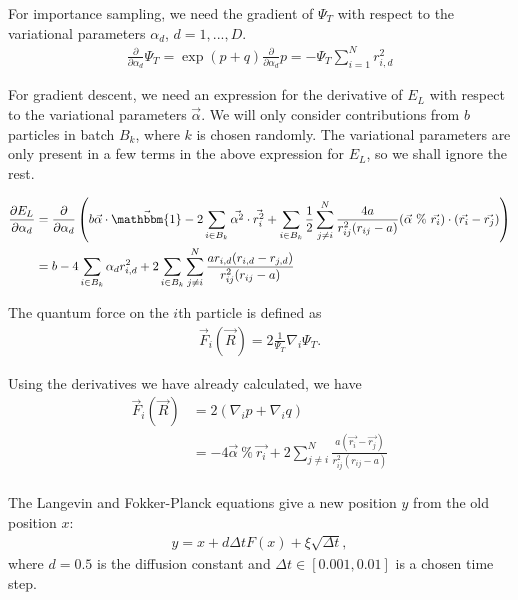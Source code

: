 \documentclass[12pt]{article}
\begin{document}
\noindent For importance sampling, we need the gradient of $\Psi_T$ with respect to the variational parameters $\alpha_d$, $d=1,...,D$. 
\begin{align*}
\frac{\partial}{\partial \alpha_d} \Psi_T = \exp(p+q) \frac{\partial}{\partial \alpha_d} p = - \Psi_T \sum_{i=1}^N r_{i,d}^2
\end{align*}

\noindent For gradient descent, we need an expression for the derivative of $E_L$ with respect to the variational parameters $\vec{\alpha}$. We will only consider contributions from $b$ particles in batch $B_k$, where $k$ is chosen randomly. The variational parameters are only present in a few terms in the above expression for $E_L$, so we shall ignore the rest. 

\begin{align*}
\frac{\partial E_L}{\partial \alpha_d} 
&= \frac{\partial}{\partial \alpha_d} \left( 
b\vec{\alpha}\cdot \vec{\mathbbm{1}} - 2 \sum_{i \in B_k} \vec{\alpha^2}\cdot \vec{r_i^2} 
+ \sum_{i\in B_k} \frac{1}{2} \sum_{j\neq i}^N \frac{4a}{r_{ij}^2(r_{ij}-a)} (\vec{\alpha} \  \% \ \vec{r_i}) \cdot (\vec{r_i}-\vec{r_j})
 \right)\\
 &= b -4 \sum_{i \in B_k} \alpha_d r_{i,d}^2 +2 \sum_{i \in B_k} \sum_{j \neq i}^N \frac{a r_{i,d}(r_{i,d}-r_{j,d})}{r_{ij}^2(r_{ij}-a)}
\end{align*}



The quantum force on the $i$th particle is defined as 
\begin{align}
\vec{F}_i(\vec{R}) = 2 \frac{1}{\Psi_T} \nabla_i \Psi_T.
\end{align}

Using the derivatives we have already calculated, we have
\begin{align*}
\vec{F}_i(\vec{R}) &= 2 ( \nabla_i p + \nabla_i q)\\
&= -4\vec{\alpha} \ \% \ \vec{r_i} + 2 \sum_{j\neq i}^N \frac{a(\vec{r_i}-\vec{r_j})}{r_{ij}^2(r_{ij}-a)}  \\
\end{align*}

\noindent The Langevin and Fokker-Planck equations give a new position $y$ from the old position $x$:
\begin{align}
y = x + d\Delta tF(x) + \xi \sqrt{\Delta t},
\end{align}
where $d=0.5$ is the diffusion constant and $\Delta t \in [0.001,0.01]$ is a chosen time step. \\
\end{document}
